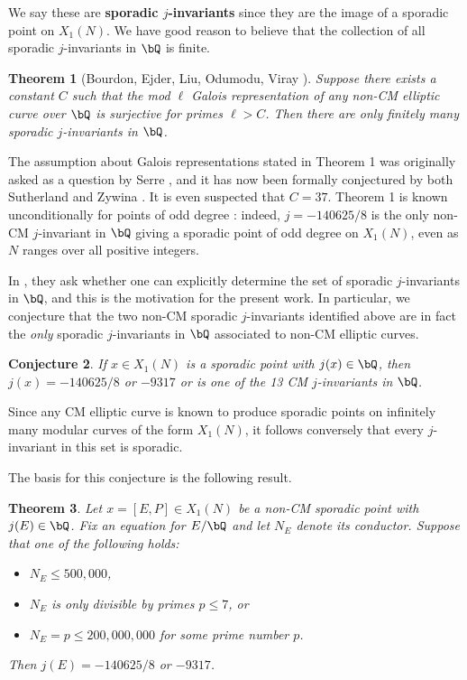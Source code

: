 \documentclass[11pt,reqno]{amsart}
\theoremstyle{plain}
\newtheorem{theorem}{Theorem}%
\newtheorem{conjecture}[theorem]{Conjecture}
\theoremstyle{definition}
\newcommand{\Q}{\bQ}
\begin{document}
We say these are \textbf{sporadic $j$-invariants} since they are the image of a sporadic point on $X_1(N)$. We have good reason to believe that the collection of all sporadic $j$-invariants in $\Q$ is finite.
\begin{theorem}[Bourdon, Ejder, Liu, Odumodu, Viray \cite{BELOV}]
Suppose there exists a constant $C$ such that the mod $\ell$ Galois representation of any non-CM elliptic curve over $\Q$ is surjective for primes $\ell>C$. Then there are only finitely many sporadic $j$-invariants in $\Q$.
\end{theorem}

\noindent The assumption about Galois representations stated in Theorem 1 was originally asked as a question by Serre \cite{serre72}, and it has now been formally conjectured by both Sutherland \cite{sutherland} and Zywina \cite{ZywinaImages}. It is even suspected that $C=37$. Theorem 1 is known unconditionally for points of odd degree \cite{OddDeg}: indeed, $j=-140625/8$ is the only non-CM $j$-invariant in $\Q$ giving a sporadic point of odd degree on $X_1(N)$, even as $N$ ranges over all positive integers.

In \cite{BELOV}, they ask whether one can explicitly determine the set of sporadic $j$-invariants in $\Q$, and this is the motivation for the present work. In particular, we conjecture that the two non-CM sporadic $j$-invariants identified above are in fact the \emph{only} sporadic $j$-invariants in $\Q$ associated to non-CM elliptic curves.

\begin{conjecture}
If $x\in X_1(N)$ is a sporadic point with $j(x) \in \Q$, then $j(x)=-140625/8$ or $-9317$ or is one of the 13 CM $j$-invariants in $\Q$.
\end{conjecture}

\noindent Since any CM elliptic curve is known to produce sporadic points on infinitely many modular curves of the form $X_1(N)$, it follows conversely that every $j$-invariant in this set is sporadic.

The basis for this conjecture is the following result.

\begin{theorem}
Let $x=[E,P]\in X_1(N)$ be a non-CM sporadic point with $j(E) \in \Q$.
Fix an equation for $E/\Q$ and let $N_E$ denote its conductor.
Suppose that one of the following holds:
\begin{itemize}
    \item$N_E \leq 500{,}000$,
    \item $N_E$ is only divisible by primes $p \leq 7$, or
    \item $N_E=p \leq 200{,}000{,}000$ for some prime number $p$.
\end{itemize}
Then $j(E) =-140625/8$ or $-9317$.
\end{theorem}
\end{document}
